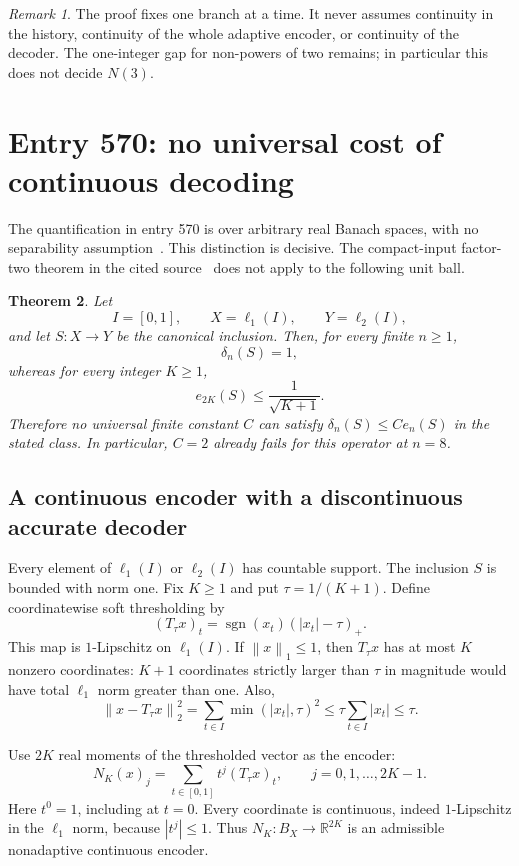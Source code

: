 \documentclass[11pt,a4paper]{article}
\newtheorem{theorem}{Theorem}[section]
\theoremstyle{remark}
\newtheorem{remark}[theorem]{Remark}
\newcommand{\R}{\mathbb R}
\newcommand{\norm}[1]{\left\lVert #1\right\rVert}
\newcommand{\sgn}{\operatorname{sgn}}
\begin{document}
\begin{remark}
The proof fixes one branch at a time. It never assumes continuity in the history, continuity of the whole adaptive encoder, or continuity of the decoder. The one-integer gap for non-powers of two remains; in particular this does not decide $N(3)$.
\end{remark}

\newpage
\section{Entry 570: no universal cost of continuous decoding}\label{sec:decoder}

The quantification in entry 570 is over arbitrary real Banach spaces, with no separability assumption~\cite{repo570}. This distinction is decisive. The compact-input factor-two theorem in the cited source~\cite{knu} does not apply to the following unit ball.

\begin{theorem}\label{thm:decoder}
Let
\[
 I=[0,1],\qquad X=\ell_1(I),\qquad Y=\ell_2(I),
\]
and let $S:X\to Y$ be the canonical inclusion. Then, for every finite $n\ge1$,
\[
 \delta_n(S)=1,
\]
whereas for every integer $K\ge1$,
\[
 e_{2K}(S)\le\frac1{\sqrt{K+1}}.
\]
Therefore no universal finite constant $C$ can satisfy $\delta_n(S)\le Ce_n(S)$ in the stated class. In particular, $C=2$ already fails for this operator at $n=8$.
\end{theorem}

\subsection{A continuous encoder with a discontinuous accurate decoder}

Every element of $\ell_1(I)$ or $\ell_2(I)$ has countable support. The inclusion $S$ is bounded with norm one. Fix $K\ge1$ and put $\tau=1/(K+1)$. Define coordinatewise soft thresholding by
\[
 (T_\tau x)_t=\sgn(x_t)(|x_t|-\tau)_+.
\]
This map is $1$-Lipschitz on $\ell_1(I)$. If $\norm{x}_1\le1$, then $T_\tau x$ has at most $K$ nonzero coordinates: $K+1$ coordinates strictly larger than $\tau$ in magnitude would have total $\ell_1$ norm greater than one. Also,
\begin{equation}\label{eq:soft-error}
 \norm{x-T_\tau x}_2^2
 =\sum_{t\in I}\min(|x_t|,\tau)^2
 \le\tau\sum_{t\in I}|x_t|\le\tau.
\end{equation}

Use $2K$ real moments of the thresholded vector as the encoder:
\begin{equation}\label{eq:momentencoder}
 N_K(x)_j=\sum_{t\in[0,1]}t^j(T_\tau x)_t,
 \qquad j=0,1,\ldots,2K-1.
\end{equation}
Here $t^0=1$, including at $t=0$. Every coordinate is continuous, indeed $1$-Lipschitz in the $\ell_1$ norm, because $|t^j|\le1$. Thus $N_K:B_X\to\R^{2K}$ is an admissible nonadaptive continuous encoder.
\end{document}
